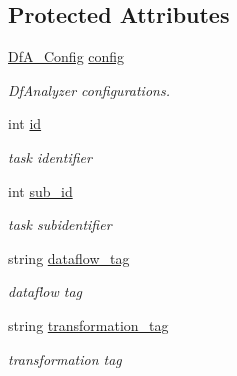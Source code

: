 \subsection*{Protected Attributes}
\begin{DoxyCompactItemize}
\item 
\mbox{\label{classTask_a4b37b74b87a4419297e52180e715152c}} 
\hyperlink{structDfA__Config}{Df\+A\+\_\+\+Config} \hyperlink{classTask_a4b37b74b87a4419297e52180e715152c}{config}
\begin{DoxyCompactList}\small\item\em Df\+Analyzer configurations. \end{DoxyCompactList}\item 
\mbox{\label{classTask_a1bdc8139dd647f9701e9f43e588749d7}} 
int \hyperlink{classTask_a1bdc8139dd647f9701e9f43e588749d7}{id}
\begin{DoxyCompactList}\small\item\em task identifier \end{DoxyCompactList}\item 
\mbox{\label{classTask_aa5e5de369b641d4a6d66bd468d47b28b}} 
int \hyperlink{classTask_aa5e5de369b641d4a6d66bd468d47b28b}{sub\+\_\+id}
\begin{DoxyCompactList}\small\item\em task subidentifier \end{DoxyCompactList}\item 
\mbox{\label{classTask_a7a3b3f194a78e928cd9a88420676cfa2}} 
string \hyperlink{classTask_a7a3b3f194a78e928cd9a88420676cfa2}{dataflow\+\_\+tag}
\begin{DoxyCompactList}\small\item\em dataflow tag \end{DoxyCompactList}\item 
\mbox{\label{classTask_a013314768d0b474bcc567f1cb98a1c01}} 
string \hyperlink{classTask_a013314768d0b474bcc567f1cb98a1c01}{transformation\+\_\+tag}
\begin{DoxyCompactList}\small\item\em transformation tag \end{DoxyCompactList}\item 
\mbox{\label{classTask_a9827ffbb7019894dffd2c27350613634}} 

\end{DoxyCompactItemize}
